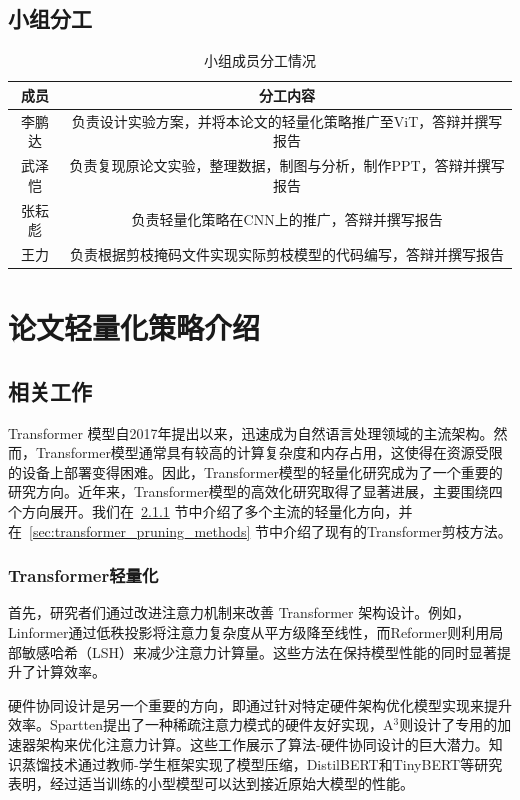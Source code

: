 \documentclass[UTF8,openany]{ctexbook}
\begin{document}
\section{小组分工}
\begin{table}[h]
\centering
\begin{tabular}{|c|c|}
\hline
\textbf{成员} & \textbf{分工内容} \\
\hline
李鹏达 & 负责设计实验方案，并将本论文的轻量化策略推广至ViT，答辩并撰写报告 \\
\hline
武泽恺 & 负责复现原论文实验，整理数据，制图与分析，制作PPT，答辩并撰写报告 \\
\hline
张耘彪 & 负责轻量化策略在CNN上的推广，答辩并撰写报告\\
\hline
王力 &  负责根据剪枝掩码文件实现实际剪枝模型的代码编写，答辩并撰写报告\\
\hline
\end{tabular}
\caption{小组成员分工情况}
\end{table}

\chapter{论文轻量化策略介绍}

\section{相关工作}

Transformer \cite{vaswani2017attention}模型自2017年提出以来，迅速成为自然语言处理领域的主流架构。然而，Transformer模型通常具有较高的计算复杂度和内存占用，这使得在资源受限的设备上部署变得困难。因此，Transformer模型的轻量化研究成为了一个重要的研究方向。近年来，Transformer模型的高效化研究取得了显著进展，主要围绕四个方向展开。我们在~\ref{sec:transformer_pruning} 节中介绍了多个主流的轻量化方向，并在~\ref{sec:transformer_pruning_methods} 节中介绍了现有的Transformer剪枝方法。

\subsection{Transformer轻量化}
\label{sec:transformer_pruning}

首先，研究者们通过改进注意力机制来改善 Transformer 架构设计。例如，Linformer\cite{wang2020linformer}通过低秩投影将注意力复杂度从平方级降至线性，而Reformer\cite{kitaev2020reformer}则利用局部敏感哈希（LSH）来减少注意力计算量。这些方法在保持模型性能的同时显著提升了计算效率。

硬件协同设计是另一个重要的方向，即通过针对特定硬件架构优化模型实现来提升效率。Spartten\cite{wang2021spatten}提出了一种稀疏注意力模式的硬件友好实现，A$^3$\cite{ham2020a3}则设计了专用的加速器架构来优化注意力计算。这些工作展示了算法-硬件协同设计的巨大潜力。知识蒸馏技术通过教师-学生框架实现了模型压缩，DistilBERT\cite{sanh2019distilbert}和TinyBERT\cite{jiao2020tinybert}等研究表明，经过适当训练的小型模型可以达到接近原始大模型的性能。
\end{document}

